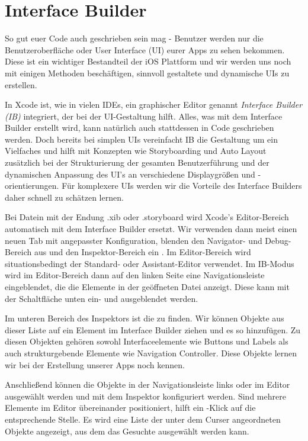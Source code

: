 \documentclass[parskip=half, final]{scrreprt}
\begin{document}
\section{Interface Builder}\label{sec:ib}

So gut euer Code auch geschrieben sein mag - Benutzer werden nur die Benutzeroberfläche oder User Interface (UI) eurer Apps zu sehen bekommen. Diese ist ein wichtiger Bestandteil der iOS Plattform und wir werden uns noch mit einigen Methoden beschäftigen, sinnvoll gestaltete und dynamische UIs zu erstellen.

In Xcode ist, wie in vielen IDEs, ein graphischer Editor genannt \emph{Interface Builder (IB)} integriert, der bei der UI-Gestaltung hilft. Alles, was mit dem Interface Builder erstellt wird, kann natürlich auch stattdessen in Code geschrieben werden. Doch bereits bei simplen UIs vereinfacht IB die Gestaltung um ein Vielfaches und hilft mit Konzepten wie Storyboarding und Auto Layout zusätzlich bei der Strukturierung der gesamten Benutzerführung und der dynamischen Anpassung des UI's an verschiedene Displaygrößen und -orientierungen. Für komplexere UIs werden wir die Vorteile des Interface Builders daher schnell zu schätzen lernen.

Bei Datein mit der Endung .xib oder .storyboard wird Xcode's Editor-Bereich automatisch mit dem Interface Builder ersetzt. Wir verwenden dann meist einen neuen Tab mit angepasster Konfiguration, blenden den Navigator- und Debug-Bereich aus und den Inspektor-Bereich ein . Im Editor-Bereich wird situationsbedingt der Standard- oder Assistant-Editor verwendet. Im IB-Modus wird im Editor-Bereich dann auf den linken Seite eine Navigationsleiste eingeblendet, die die Elemente in der geöffneten Datei anzeigt. Diese kann mit der Schaltfläche unten ein- und ausgeblendet werden.


Im unteren Bereich des Inspektors ist die  zu finden. Wir können Objekte aus dieser Liste auf ein Element im Interface Builder ziehen und es so hinzufügen. Zu diesen Objekten gehören sowohl Interfaceelemente wie Buttons und Labels als auch strukturgebende Elemente wie Navigation Controller. Diese Objekte lernen wir bei der Erstellung unserer Apps noch kennen.

Anschließend können die Objekte in der Navigationsleiste links oder im Editor ausgewählt werden und mit dem Inspektor konfiguriert werden. Sind mehrere Elemente im Editor übereinander positioniert, hilft ein \keys{\shiftkey}-Klick auf die entsprechende Stelle. Es wird eine Liste der unter dem Curser angeordneten Objekte angezeigt, aus dem das Gesuchte ausgewählt werden kann. 
\end{document}
